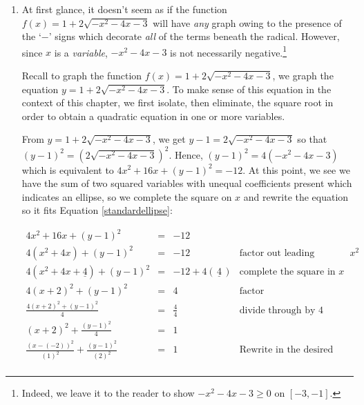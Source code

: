 \documentclass{ximera}
\begin{document}
\begin{example}
\begin{enumerate}
\begin{enumerate}
 \end{enumerate}
 
 \item  At first glance, it doesn't seem as if the function $f(x) = 1 + 2\sqrt{-x^2-4x-3}$ will have \textit{any} graph owing to the presence of the `$-$' signs which decorate \textit{all} of the terms beneath the radical.  However, since $x$ is a \textit{variable}, $-x^2 -4x -3$ is not necessarily negative.\footnote{Indeed, we leave it to the reader to show $-x^2-4x-3 \geq 0$ on $[-3,-1]$.}
 
 
  
 
Recall to graph the function $f(x) = 1 + 2\sqrt{-x^2-4x-3}$, we graph the equation $y = 1 + 2\sqrt{-x^2-4x-3}$.  To make sense of this equation in the context of this chapter, we first isolate, then eliminate, the square root in order to obtain a quadratic equation in one or more variables.

 
 
 From $y = 1 + 2\sqrt{-x^2-4x-3}$, we get $y-1 =  2\sqrt{-x^2-4x-3}$ so that $(y-1)^2 = (2\sqrt{-x^2-4x-3})^2$.  Hence,  $(y-1)^2 = 4(-x^2-4x-3)$ which is equivalent to $4x^2 + 16x + (y-1)^2 = -12$. At this point, we see we have the sum of two squared variables with unequal coefficients present which indicates an ellipse, so we complete the square on $x$ and rewrite the equation so it fits  Equation \ref{standardellipse}:
 
 \[ \begin{array}{rclr} 4x^2 + 16x + (y-1)^2 & = &  -12 & \\ 

4 \left(x^2 + 4x \right)+(y-1)^2  &  = & -12 &  \text{factor out leading coefficient of $x^2$} \\   

4\left(x^2 + 4x +\underline{4}\right) + (y-1)^2  &  = & -12 + 4( \, \underline{4} \, ) & \text{complete the square in $x$} \\ 

4(x+2)^2 + (y-1)^2  &  = & 4 & \text{factor}  \\   

\frac{4(x+2)^2 + (y-1)^2}{4}  &  = & \frac{4}{4} & \text{divide through by $4$} \\ 

(x+2)^2 + \frac{(y-1)^2}{4} & = & 1 & \\  
 
 \frac{(x-(-2))^2}{(1)^2} + \frac{(y-1)^2}{(2)^2} & = & 1 &  \text{Rewrite in the desired form.} \\  \end{array} \]
 

\end{enumerate}
\end{example}
\end{document}

